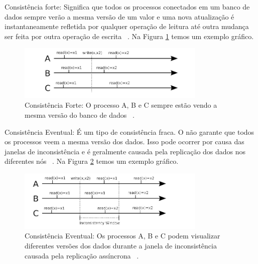 Consistência forte: Significa que todos os processos conectados em um banco de dados sempre verão a mesma versão de um valor e uma nova atualização é instantaneamente refletida por qualquer operação de leitura até outra mudança ser feita por outra operação de escrita ~\cite{Orendanalysisand}. Na Figura \ref{fig:strongconsistency} temos um exemplo gráfico.

	\begin{figure}[!htbp]
		\begin{center}
			\includegraphics[width=0.8\textwidth]{strongconsistency}
		\end{center}
		\caption{Consistência Forte: O processo A, B e C sempre estão vendo a mesma versão do banco de dados ~\cite{Orendanalysisand}.}
		\label{fig:strongconsistency}
	\end{figure}

Consistência Eventual: É um tipo de consistência fraca. O não garante que todos os processos veem a mesma versão dos dados. Isso pode ocorrer por causa das janelas de inconsistência e é geralmente causada pela replicação dos dados nos diferentes nós ~\cite{Orendanalysisand}. Na Figura \ref{fig:eventualconsistency} temos um exemplo gráfico.

	\begin{figure}[!htbp]
		\begin{center}
			\includegraphics[width=0.8\textwidth]{eventualconsistency}
		\end{center}
		\caption{Consistência Eventual: Os processos A, B e C podem visualizar diferentes versões dos dados durante a janela de inconsistência causada pela replicação assíncrona ~\cite{Orendanalysisand}.}
		\label{fig:eventualconsistency}
	\end{figure}







